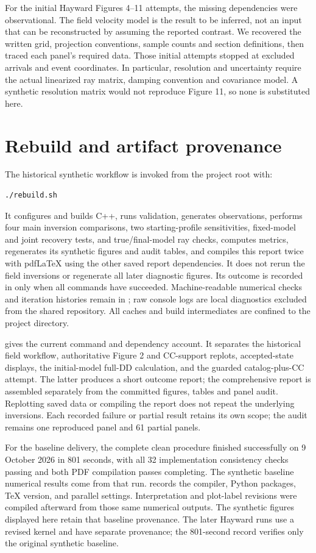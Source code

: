 \documentclass[11pt]{article}
\begin{document}
For the initial Hayward Figures 4--11 attempts, the missing dependencies were observational.
The field velocity model is the result to be inferred, not an input that can
be reconstructed by assuming the reported contrast. We recovered the written
grid, projection conventions, sample counts and section definitions, then
traced each panel's required data. Those initial attempts stopped at excluded arrivals
and event coordinates. In particular, resolution and uncertainty require
the actual linearized ray matrix, damping convention and covariance model.
A synthetic resolution matrix would not reproduce Figure 11, so none is
substituted here.

\section{Rebuild and artifact provenance}
The historical synthetic workflow is invoked from the project root with:
\begin{lstlisting}
./rebuild.sh
\end{lstlisting}
It configures and builds C++, runs validation, generates observations,
performs four main inversion comparisons, two starting-profile sensitivities,
fixed-model and joint recovery tests, and true/final-model ray checks,
computes metrics, regenerates its synthetic figures and audit tables, and
compiles this report twice with pdfLaTeX using the other saved report
dependencies. It does not rerun the field inversions or regenerate all later
diagnostic figures. Its outcome is recorded in  only
when all commands have succeeded. Machine-readable numerical checks and
iteration histories remain in ; raw console logs are local
diagnostics excluded from the shared repository. All caches and build intermediates
are confined to the project directory.

 gives the current command and dependency account. It separates
the historical field workflow, authoritative Figure 2 and CC-support replots,
accepted-state displays, the initial-model full-DD calculation, and the
guarded catalog-plus-CC attempt. The latter produces a short outcome report;
the comprehensive report is assembled separately from the committed figures,
tables and panel audit. Replotting saved data or compiling the report does not
repeat the underlying inversions. Each recorded failure or partial result
retains its own scope; the audit remains one reproduced panel and 61 partial
panels.

For the baseline delivery, the complete clean procedure finished successfully on
9 October 2026 in 801 seconds, with all 32 implementation consistency checks
passing and both PDF compilation passes completing. The synthetic baseline
numerical results come from that run.  records the
compiler, Python packages, TeX version, and parallel settings.
Interpretation and plot-label revisions were compiled afterward from those
same numerical outputs. The synthetic figures displayed here retain that
baseline provenance. The later Hayward runs use a revised kernel and have
separate provenance; the 801-second record verifies only the original
synthetic baseline.
\end{document}
